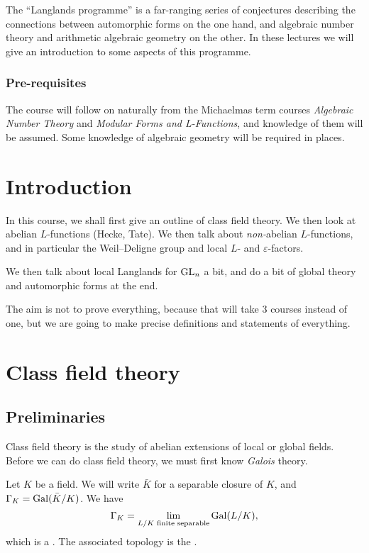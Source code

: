 \documentclass[a4paper]{article}
\begin{document}
\maketitle
{\small
\setlength{\parindent}{0em}
\setlength{\parskip}{1em}
The ``Langlands programme'' is a far-ranging series of conjectures describing the connections between automorphic forms on the one hand, and algebraic number theory and arithmetic algebraic geometry on the other. In these lectures we will give an introduction to some aspects of this programme.

\subsubsection*{Pre-requisites}
The course will follow on naturally from the Michaelmas term courses \emph{Algebraic Number Theory} and \emph{Modular Forms and L-Functions}, and knowledge of them will be assumed. Some knowledge of algebraic geometry will be required in places.
}
\tableofcontents

\setcounter{section}{-1}
\section{Introduction}
In this course, we shall first give an outline of class field theory. We then look at abelian $L$-functions (Hecke, Tate). We then talk about \emph{non-}abelian $L$-functions, and in particular the Weil--Deligne group and local $L$- and $\varepsilon$-factors.

We then talk about local Langlands for $\mathrm{GL}_n$ a bit, and do a bit of global theory and automorphic forms at the end.

The aim is not to prove everything, because that will take 3 courses instead of one, but we are going to make precise definitions and statements of everything.

\section{Class field theory}
\subsection{Preliminaries}
Class field theory is the study of abelian extensions of local or global fields. Before we can do class field theory, we must first know \emph{Galois} theory.
\begin{notation}
  Let $K$ be a field. We will write $\bar{K}$ for a separable closure of $K$, and $\Gamma_K = \operatorname{Gal}(\bar{K}/K)$. We have
  \[
    \Gamma_K = \lim_{L/K\text{ finite separable}} \operatorname{Gal}(L/K),
  \]
  which is a . The associated topology is the .
\end{notation}
\end{document}
